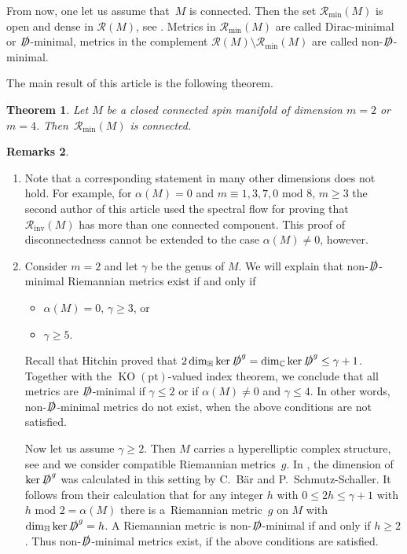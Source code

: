 \documentclass[pdftex]{sigma}
\newcommand\Dirac{\slashed{D}} %
\newcommand\Dminimal{$\Dirac$-minimal}
\newcommand\<{\langle}
\renewcommand\>{\rangle}
\newcommand\point{\mathrm{pt}}
\newcommand{\CC}{\mathbb C}
\newcommand{\HH}{\mathbb{H}}
\newcommand{\KO}{{\operatorname{KO}}}
\newcommand{\mod}{\,\,\mathrm{mod}\,\,}
\newcommand{\maR}{\mathcal R}
\newtheorem{Theorem}{Theorem}[section]
\theoremstyle{definition}
\newtheorem{Remarks}[Theorem]{Remarks}
\newcommand\={\,=\,}
\newcommand\Rmin{\maR_{\mathrm{min}}}
\newcommand\Rinv{\maR_{\mathrm{inv}}}
\numberwithin{equation}{section}
\begin{document}
From now, one let us assume that~$M$ is connected. Then the set $\Rmin(M)$ is open and dense in $\maR(M)$, see \cite{ammann.dahl.humbert:09}. Metrics in $\Rmin(M)$ are called Dirac-minimal or \Dminimal{}, metrics in the complement $\maR(M) \setminus \Rmin(M)$ are called non-\Dminimal.

The main result of this article is the following theorem.
\begin{Theorem}\label{thm.main}
Let $M$ be a closed connected spin manifold of dimension $m=2$ or $m=4$. Then~$\Rmin(M)$ is connected.
\end{Theorem}

\begin{Remarks}\quad
\begin{enumerate}[(1)]\itemsep=0pt
\item
Note that a corresponding statement in many other dimensions does not hold. For example, for $\alpha(M)=0$ and $m\equiv 1,3,7,0\mod 8$, $m\geq 3$ the second author of this article \cite{dahl:2008} used the spectral flow for proving that $\Rinv(M)$ has more than one connected component.
This proof of disconnectedness cannot be extended to the case $\alpha(M)\neq 0$, however.
\item
Consider $m=2$ and let $\gamma$ be the genus of $M$. We will explain that non-\Dminimal{} Riemannian metrics exist if and only if
\begin{itemize}\itemsep=0pt
 \item $\alpha(M)=0$, $\gamma\geq 3$, or
 \item $\gamma\geq 5$.
\end{itemize}
Recall that Hitchin proved \cite[end of Section~2.1 and proof of Proposition~2.3]{hitchin:74} that $2\dim_\HH \ker\Dirac^g=\dim_\CC\ker\Dirac^g\leq \gamma+1$. Together with the $\KO(\point)$-valued index theorem, we conclude that all metrics are \Dminimal{} if $\gamma\leq 2$ or if $\alpha(M)\neq 0$ and $\gamma\leq 4$. In other words, non-\Dminimal{} metrics do not exist, when the above conditions are not satisfied.

Now let us assume $\gamma\geq 2$. Then $M$ carries a hyperelliptic complex structure, see \cite[Section~III.7]{farkas.kra:92} and we consider compatible Riemannian metrics~$g$.
In \cite{baer.schmutz:92}, the dimension of $\ker\Dirac^g$ was calculated in this setting by C.~B\"ar and P.~Schmutz-Schaller.
It follows from their calculation that for any integer $h$ with $0\leq 2 h \leq \gamma+1$ with $h\mod 2=\alpha(M)$ there is a~Riemannian metric~$g$ on $M$ with $\dim_\HH\ker\Dirac^g=h$. A Riemannian metric is non-\Dminimal{} if and only if $h\geq 2$. Thus non-\Dminimal{} metrics exist, if the above conditions are satisfied.


\end{enumerate}
\end{Remarks}
\end{document}

